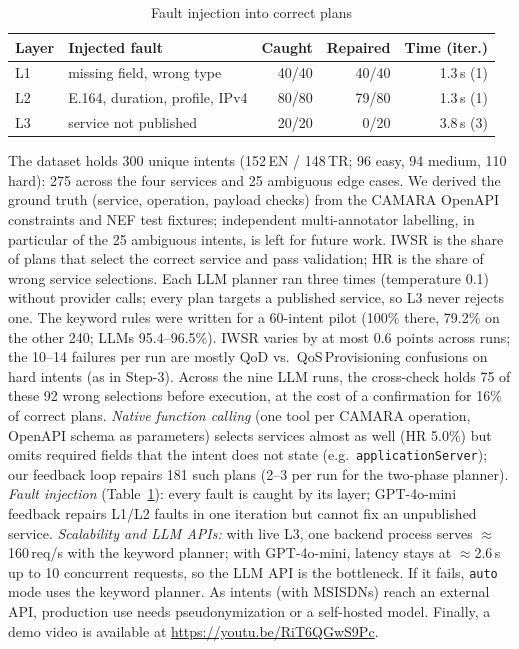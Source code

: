 \documentclass[conference]{IEEEtran}
\begin{document}
\begin{table}[t]
\centering
\caption{Fault injection into correct plans} %
\label{tab:faults}
\scriptsize
\setlength{\tabcolsep}{2.6pt}
\begin{tabular}{llrrr}
\toprule
\textbf{Layer} & \textbf{Injected fault} & \textbf{Caught} & \textbf{Repaired} & \textbf{Time (iter.)} \\
\midrule
L1 & missing field, wrong type & 40/40 & 40/40 & 1.3\,s (1) \\
L2 & E.164, duration, profile, IPv4 & 80/80 & 79/80 & 1.3\,s (1) \\
L3 & service not published & 20/20 & 0/20 & 3.8\,s (3) \\
\bottomrule
\end{tabular}
\end{table}
The dataset holds 300 unique intents (152\,EN / 148\,TR; 96 easy, 94 medium, 110 hard):
275 across the four services and 25 ambiguous edge cases. We derived the ground truth
(service, operation, payload checks) from the CAMARA OpenAPI constraints and NEF test
fixtures; independent multi-annotator labelling, in particular of the 25 ambiguous
intents, is left for future work. IWSR is the share of plans that select the correct
service and pass validation; HR is the share of wrong service selections. Each LLM
planner ran three times (temperature 0.1) without provider calls; every plan targets a
published service, so L3 never rejects one. The keyword rules were written for a 60-intent
pilot (100\% there, 79.2\% on the other 240; LLMs 95.4--96.5\%). IWSR varies by at most
0.6 points across runs; the 10--14 failures per run are mostly QoD vs.\
QoS\,Provisioning confusions on hard intents (as in Step-3). Across the nine LLM runs, the
cross-check holds 75 of these 92 wrong selections before execution, at the cost of a
confirmation for 16\% of correct plans.
\textit{Native function calling} (one tool per CAMARA operation, OpenAPI schema as
parameters) selects services almost as well (HR 5.0\%) but omits required fields that
the intent does not state (e.g.\ \texttt{applicationServer}); our feedback loop repairs
181 such plans (2--3 per run for the two-phase planner).
\textit{Fault injection} (Table~\ref{tab:faults}): every fault is caught by its layer;
GPT-4o-mini feedback repairs L1/L2 faults in one iteration but cannot fix an unpublished
service.
\textit{Scalability and LLM APIs:} with live L3, one backend process serves
$\approx$160\,req/s with the keyword planner; with GPT-4o-mini, latency stays at
$\approx$2.6\,s up to 10 concurrent requests, so the LLM API is the bottleneck. If it
fails, \texttt{auto} mode uses the keyword planner. As intents (with MSISDNs) reach an
external API, production use needs pseudonymization or a self-hosted model. Finally, a demo video is available at \url{https://youtu.be/RiT6QGwS9Pc}.



{\footnotesize


}
\end{document}
